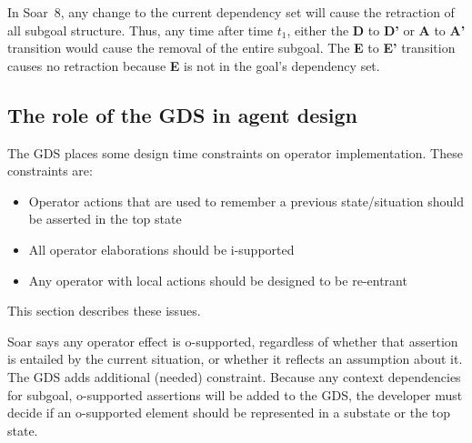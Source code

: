 In Soar~8, any change to the current dependency set will cause
the retraction of all subgoal structure.  Thus, any time after time
$t_1$, either the {\bf D} to {\bf D'} or {\bf A} to {\bf A'}
transition would cause the removal of the entire subgoal. The {\bf E}
to {\bf E'} transition causes no retraction because {\bf E} is not in
the goal's dependency set.

\subsection*{The role of the GDS in agent design}

The GDS places some design time constraints on operator implementation.
These constraints are:
\begin{itemize}
\item Operator actions that are used to remember a previous state/situation should be asserted in the top state
\item All operator elaborations should be i-supported
\item Any operator with local actions should be designed to be re-entrant
\end{itemize}
This section describes these issues.

Soar says any operator effect is o-supported, regardless of whether
that assertion is entailed by the current situation, or whether it
reflects an assumption about it.  The GDS adds additional (needed)
constraint.  Because any context dependencies for subgoal, o-supported
assertions will be added to the GDS, the developer must decide if an
o-supported element should be represented in a substate or the top
state.

